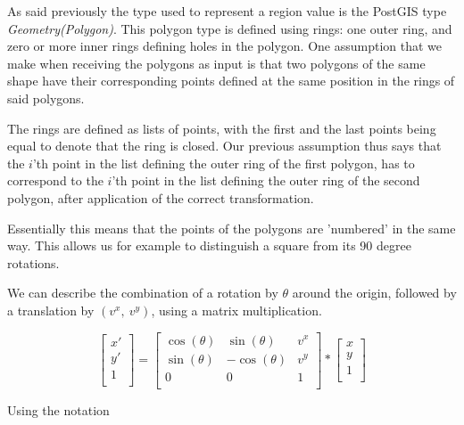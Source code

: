 
As said previously the type used to represent a region value is the PostGIS type \textit{Geometry(Polygon)}. This polygon type is defined using rings: one outer ring, and zero or more inner rings defining holes in the polygon. One assumption that we make when receiving the polygons as input is that two polygons of the same shape have their corresponding points defined at the same position in the rings of said polygons. 

The rings are defined as lists of points, with the first and the last points being equal to denote that the ring is closed. Our previous assumption thus says that the $i$'th point in the list defining the outer ring of the first polygon, has to correspond to the $i$'th point in the list defining the outer ring of the second polygon, after application of the correct transformation.

Essentially this means that the points of the polygons are 'numbered' in the same way. This allows us for example to distinguish a square from its 90 degree rotations.


We can describe the combination of a rotation by $\theta$ around the origin, followed by a translation by $(v^x,\ v^y)$, using a matrix multiplication.

\[
    \begin{bmatrix}
    x' \\
    y' \\ 
    1  \\       
    \end{bmatrix}
    =
    \begin{bmatrix}
    \cos(\theta) & \sin(\theta)  & v^x \\
    \sin(\theta) & -\cos(\theta) & v^y \\ 
    0            & 0             & 1   \\       
    \end{bmatrix}
    *
    \begin{bmatrix}
    x \\
    y \\ 
    1 \\       
    \end{bmatrix}
\]

Using the notation

